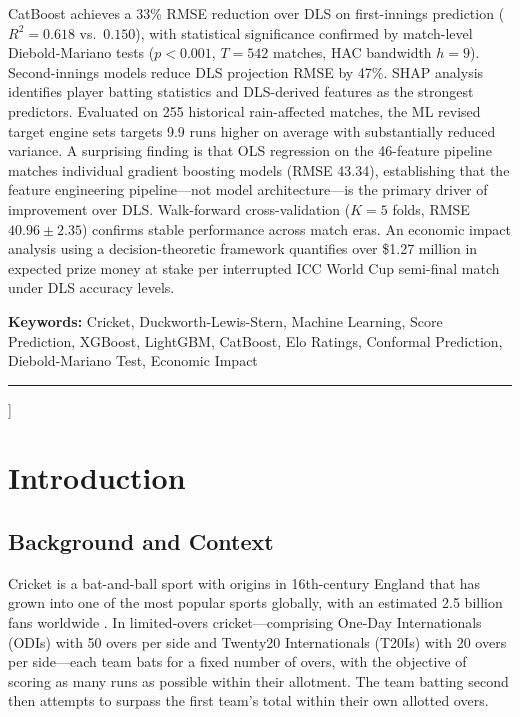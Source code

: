 \documentclass[10pt,a4paper,twocolumn]{article}
\begin{document}
{CatBoost achieves a 33\% RMSE reduction over DLS on first-innings prediction ($R^2 = 0.618$ vs.\ $0.150$), with statistical significance confirmed by match-level Diebold-Mariano tests ($p < 0.001$, $T = 542$ matches, HAC bandwidth $h=9$). Second-innings models reduce DLS projection RMSE by 47\%. SHAP analysis identifies player batting statistics and DLS-derived features as the strongest predictors. Evaluated on 255 historical rain-affected matches, the ML revised target engine sets targets 9.9 runs higher on average with substantially reduced variance. A surprising finding is that OLS regression on the 46-feature pipeline matches individual gradient boosting models (RMSE 43.34), establishing that the feature engineering pipeline---not model architecture---is the primary driver of improvement over DLS. Walk-forward cross-validation ($K=5$ folds, RMSE $40.96 \pm 2.35$) confirms stable performance across match eras. An economic impact analysis using a decision-theoretic framework quantifies over \$1.27 million in expected prize money at stake per interrupted ICC World Cup semi-final match under DLS accuracy levels.

\smallskip
\noindent\textbf{Keywords:} Cricket, Duckworth-Lewis-Stern, Machine Learning, Score Prediction, XGBoost, LightGBM, CatBoost, Elo Ratings, Conformal Prediction, Diebold-Mariano Test, Economic Impact

\vspace{0.8em}
\noindent\rule{\linewidth}{0.4pt}
\vspace{0.6em}
}]

\section{Introduction}
\label{sec:intro}

\subsection{Background and Context}

Cricket is a bat-and-ball sport with origins in 16th-century England that has grown into one of the most popular sports globally, with an estimated 2.5 billion fans worldwide \citep{icc2023}. In limited-overs cricket---comprising One-Day Internationals (ODIs) with 50 overs per side and Twenty20 Internationals (T20Is) with 20 overs per side---each team bats for a fixed number of overs, with the objective of scoring as many runs as possible within their allotment. The team batting second then attempts to surpass the first team's total within their own allotted overs.
\end{document}
